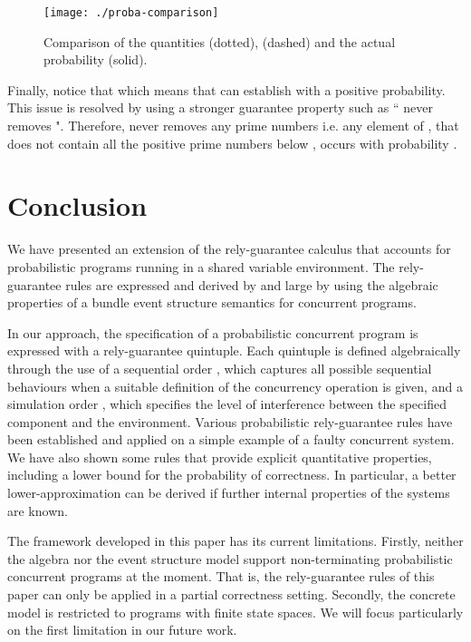 \documentclass[review]{elsart}
\begin{document}
\begin{figure}
\centering
\texttt{[image: ./proba-comparison]}
\caption{Comparison of the quantities  (dotted),  (dashed) and the actual probability  (solid).}
\label{fig:comparison}
\end{figure}


Finally, notice that  which means that  can establish  with a positive probability. This issue is resolved by using a stronger guarantee property such as `` never removes ". Therefore,  never removes any prime numbers i.e. any element of , that does not contain all the positive prime numbers below , occurs with probability .
 
\section{Conclusion}

We have presented an extension of the rely-guarantee calculus that accounts for probabilistic programs running in a shared variable environment. The rely-guarantee rules are expressed and derived by and large by using the algebraic properties of a bundle event structure semantics for concurrent programs. 

In our approach, the specification of a probabilistic concurrent program is expressed with a rely-guarantee quintuple. Each quintuple is defined algebraically through the use of a sequential order , which captures all possible sequential behaviours when a suitable definition of the concurrency operation  is given, and a simulation order , which specifies the level of interference between the specified component and the environment. Various probabilistic rely-guarantee rules have been established and applied on a simple example of a faulty concurrent system. We have also shown some rules that provide explicit quantitative properties, including a lower bound for the probability of correctness. In particular, a better lower-approximation can be derived if further internal properties of the systems are known.

The framework developed in this paper has its current limitations. Firstly, neither the algebra nor the event structure model support non-terminating probabilistic concurrent programs at the moment. That is, the rely-guarantee rules of this paper can only be applied in a partial correctness setting. Secondly, the concrete model is restricted to programs with finite state spaces. We will focus particularly on the first limitation in our future work.
\end{document}
